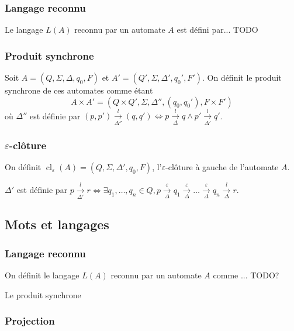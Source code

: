 \documentclass[10pt,a4paper]{article}
\begin{document}
\subsubsection{Langage reconnu}

Le langage $L(A)$ reconnu par un automate $A$ est d\'efini par... TODO


\subsubsection{Produit synchrone}

Soit $A = (Q, \Sigma, \Delta, q_0, F)$ et $A' = (Q', \Sigma, \Delta', q_0', F')$. On définit le produit synchrone de ces automates comme \'etant $$A\times A' = (Q \times Q', \Sigma, \Delta'', (q_0, q_0'), F\times F')$$ o\`u $\Delta''$ est d\'efinie par $(p,p')\overset{l}{\underset{\Delta''}{\to}}(q,q') \iff p\overset{l}{\underset{\Delta}{\to}}q \land p'\overset{l}{\underset{\Delta'}{\to}}q'$.

\subsubsection{$\varepsilon$-clôture}

On définit  $\operatorname{cl}_\varepsilon(A) = (Q, \Sigma, \Delta', q_0, F)$, l'$\varepsilon$-clôture \`a gauche de l'automate $A$.

$\Delta'$ est d\'efinie par $p \overset{l}{\underset{\Delta'}{\to}} r \iff \exists q_1,\dots,q_n \in Q, p \overset{\varepsilon}{\underset{\Delta}{\to}} q_1 \overset{\varepsilon}{\underset{\Delta}{\to}} \dots \overset{\varepsilon}{\underset{\Delta}{\to}} q_n \overset{l}{\underset{\Delta}{\to}} r$.

\subsection{Mots et langages}

\subsubsection{Langage reconnu}

On d\'efinit le langage $L(A)$ reconnu par un automate $A$ comme ... TODO?

Le produit synchrone

\subsubsection{Projection}
\end{document}
